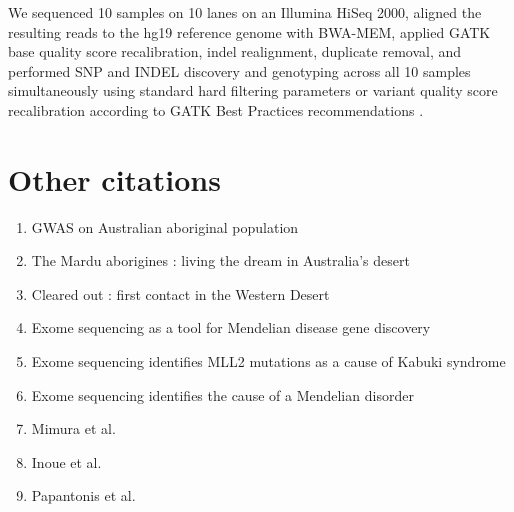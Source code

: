 \documentclass[a4paper, 10pt]{article}
\begin{document}
We sequenced 10 samples on 10 lanes on an Illumina HiSeq 2000, aligned the resulting reads to the hg19 reference genome with BWA-MEM\cite{bwamem}, applied GATK\cite{pmid20644199} base quality score recalibration, indel realignment, duplicate removal, and performed SNP and INDEL discovery and genotyping across all 10 samples simultaneously using standard hard filtering parameters or variant quality score recalibration according to GATK Best Practices recommendations \cite{pmid21478889, pmid25431634}.

\section{Other citations}

\begin{enumerate}

   \item GWAS on Australian aboriginal population \cite{pmid25760438}
   \item The Mardu aborigines : living the dream in Australia's desert\cite{tonkinson2002}
   \item Cleared out : first contact in the Western Desert\cite{davenport2005}
   \item Exome sequencing as a tool for Mendelian disease gene discovery\cite{pmid21946919}
   \item Exome sequencing identifies MLL2 mutations as a cause of Kabuki syndrome\cite{pmid20711175}
   \item Exome sequencing identifies the cause of a Mendelian disorder\cite{pmid19915526}
   \item Mimura et al.\cite{pmid22645302}
   \item Inoue et al.\cite{pmid24721177}
   \item Papantonis et al.\cite{pmid23103767}

\end{enumerate}


\end{document}
